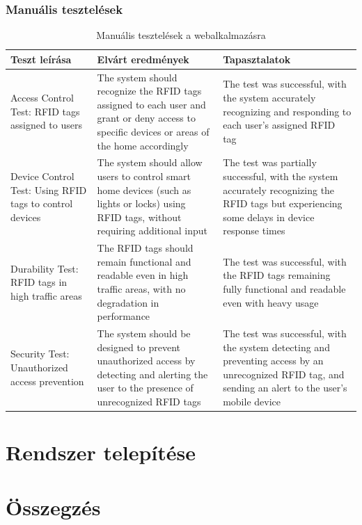 \documentclass[
]{thesis-ekf}
\theoremstyle{definition}
\theoremstyle{remark}
\begin{document}
	\subsection{Manuális tesztelések}
	\begin{table}[ht]
		\centering
		\begin{tabular}{|p{6cm}|p{6cm}|p{4cm}|}
			\hline
			\textbf{Teszt leírása} & \textbf{Elvárt eredmények} & \textbf{Tapasztalatok} \\
			\hline
			Access Control Test: RFID tags assigned to users &
			 The system should recognize the RFID tags assigned to each user and grant or deny access to specific devices or areas of the home accordingly &
			  The test was successful, with the system accurately recognizing and responding to each user's assigned RFID tag \\
			\hline
			Device Control Test: Using RFID tags to control devices &
			 The system should allow users to control smart home devices (such as lights or locks) using RFID tags, without requiring additional input &
			  The test was partially successful, with the system accurately recognizing the RFID tags but experiencing some delays in device response times \\
			\hline
			Durability Test: RFID tags in high traffic areas &
			 The RFID tags should remain functional and readable even in high traffic areas, with no degradation in performance &
			  The test was successful, with the RFID tags remaining fully functional and readable even with heavy usage \\
			\hline
			Security Test: Unauthorized access prevention &
			 The system should be designed to prevent unauthorized access by detecting and alerting the user to the presence of unrecognized RFID tags & 
			 The test was successful, with the system detecting and preventing access by an unrecognized RFID tag, and sending an alert to the user's mobile device \\
			\hline
		\end{tabular}
		\caption{Manuális tesztelések a webalkalmazásra}
		\label{table:manual-testing-results}
	\end{table}
	
	\chapter{Rendszer telepítése}

	
	\chapter*{Összegzés}
	
\end{document}
